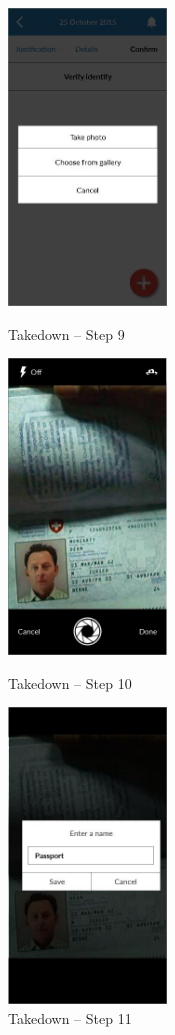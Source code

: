 \begin{figure}
  \subfigures
  \centering
  \begin{minipage}{4.6cm}
    \centering
    \includegraphics[width=4.2cm]{inc/ui_takedown_step9.jpg}
    \caption{Takedown -- Step 9}
    \label{fig:ui_takedown_step9}
  \end{minipage}
  \begin{minipage}{4.6cm}
    \centering
    \includegraphics[width=4.2cm]{inc/ui_takedown_step10.jpg}
    \caption{Takedown -- Step 10}
    \label{fig:ui_takedown_step10}
  \end{minipage}
  \begin{minipage}{4.6cm}
    \centering
    \includegraphics[width=4.2cm]{inc/ui_takedown_step11.jpg}
    \caption{Takedown -- Step 11}
    \label{fig:ui_takedown_step11}
  \end{minipage}
\end{figure}

